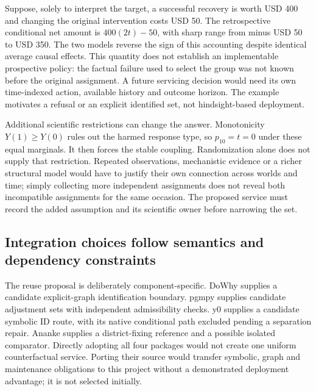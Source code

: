 Suppose, solely to interpret the target, a successful recovery is worth
USD 400 and changing the original intervention costs USD 50. The retrospective
conditional net amount is $400(2t)-50$, with sharp range from minus USD 50 to
USD 350. The two models reverse the sign of this accounting despite identical
average causal effects. This quantity does not establish an implementable
prospective policy: the factual failure used to select the group was not
known before the original assignment. A future servicing decision would need
its own time-indexed action, available history and outcome horizon. The
example motivates a refusal or an explicit identified set, not hindsight-based
deployment.~\citep{exec18_pyid_coupling}

Additional scientific restrictions can change the answer. Monotonicity
$Y(1)\geq Y(0)$ rules out the harmed response type, so $p_{10}=t=0$ under
these equal marginals. It then forces the stable coupling. Randomization alone
does not supply that restriction. Repeated observations, mechanistic evidence
or a richer structural model would have to justify their own connection across
worlds and time; simply collecting more independent assignments does not reveal
both incompatible assignments for the same occasion. The proposed service
must record the added assumption and its scientific owner before narrowing
the set.~\citep{exec18_pyid_coupling,exec18_pyid_contract}

\subsection{Integration choices follow semantics and dependency constraints}
\label{exec18:pyid-integration}

The reuse proposal is deliberately component-specific. DoWhy supplies a
candidate explicit-graph identification boundary. pgmpy supplies candidate
adjustment sets with independent admissibility checks. y0 supplies a candidate
symbolic ID route, with its native conditional path excluded pending a
separation repair. Ananke supplies a district-fixing reference and a possible
isolated comparator. Directly adopting all four packages would not create one
uniform counterfactual service. Porting their source would transfer symbolic,
graph and maintenance obligations to this project without a demonstrated
deployment advantage; it is not selected initially.
\citep{exec13_dowhy,exec13_pgmpy_reuse_primary,exec13_y0_id,exec18_pyid_one_line,exec18_pyid_contract}

